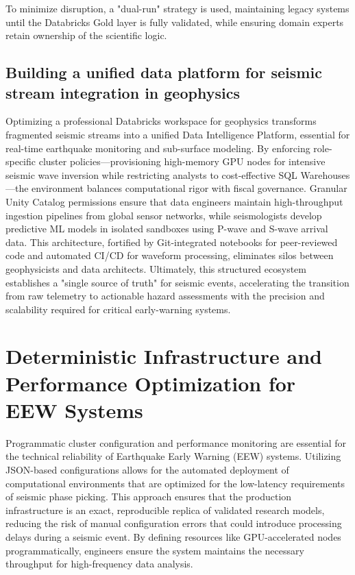 \documentclass[data,article,submit,pdftex,moreauthors]{Definitions/mdpi}
\begin{document}
To minimize disruption, a "dual-run" strategy is used, maintaining legacy systems until the Databricks Gold layer is fully validated, while ensuring domain experts retain ownership of the scientific logic.

\subsection{Building a unified data platform for seismic stream integration in geophysics}

Optimizing a professional Databricks workspace for geophysics transforms fragmented seismic streams into a unified Data Intelligence Platform, essential for real-time earthquake monitoring and sub-surface modeling. By enforcing role-specific cluster policies—provisioning high-memory GPU nodes for intensive seismic wave inversion while restricting analysts to cost-effective SQL Warehouses—the environment balances computational rigor with fiscal governance. Granular Unity Catalog permissions ensure that data engineers maintain high-throughput ingestion pipelines from global sensor networks, while seismologists develop predictive ML models in isolated sandboxes using P-wave and S-wave arrival data. This architecture, fortified by Git-integrated notebooks for peer-reviewed code and automated CI/CD for waveform processing, eliminates silos between geophysicists and data architects. Ultimately, this structured ecosystem establishes a "single source of truth" for seismic events, accelerating the transition from raw telemetry to actionable hazard assessments with the precision and scalability required for critical early-warning systems.

\section{Deterministic Infrastructure and Performance Optimization for EEW Systems}

Programmatic cluster configuration and performance monitoring are essential for the technical reliability of Earthquake Early Warning (EEW) systems. Utilizing JSON-based configurations allows for the automated deployment of computational environments that are optimized for the low-latency requirements of seismic phase picking. This approach ensures that the production infrastructure is an exact, reproducible replica of validated research models, reducing the risk of manual configuration errors that could introduce processing delays during a seismic event. By defining resources like GPU-accelerated nodes programmatically, engineers ensure the system maintains the necessary throughput for high-frequency data analysis.
\end{document}
